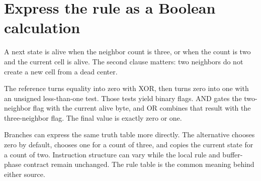 \section{Express the rule as a Boolean
  calculation}\label{008-life-generations-p07-express-the-rule-as-a-boolean-calculation}

A next state is alive when the neighbor count is three, or when the
count is two and the current cell is alive. The second clause matters:
two neighbors do not create a new cell from a dead center.

The reference turns equality into zero with XOR, then turns zero into
one with an unsigned less-than-one test. Those tests yield binary flags.
AND gates the two-neighbor flag with the current alive byte, and OR
combines that result with the three-neighbor flag. The final value is
exactly zero or one.

Branches can express the same truth table more directly. The alternative
chooses zero by default, chooses one for a count of three, and copies
the current state for a count of two. Instruction structure can vary
while the local rule and buffer-phase contract remain unchanged. The
rule table is the common meaning behind either source.
